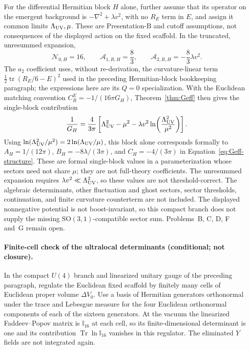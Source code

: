 For the differential Hermitian block \(H\) alone, further assume
that its operator on the emergent background is
\(-\nabla^2+\lambda v^2\), with no \(R_E\) term in \(E\), and assign
it common limits \(\Lambda_{\mathrm{UV}},\mu\). These are Presentation-B and cutoff
assumptions, not consequences of the displayed action on the fixed
scaffold. In the truncated, unresummed expansion,
\[
  \mathcal N_{0,H}=16,\qquad
  \mathcal A_{1,R,H}=\frac83,\qquad
  \mathcal A_{2,R,H}=-\frac83\lambda v^2 .
\]
The \(a_2\) coefficient uses, without re-derivation, the
curvature-linear term
\(\tfrac12\operatorname{tr}(R_E/6-E)^2\) used in the preceding
Hermitian-block bookkeeping paragraph; the expressions here are its
\(Q=0\) specialization. With the Euclidean matching convention
\(C_R^E=-1/(16\pi G_H)\), Theorem~\ref{thm:Geff} then gives the
single-block contribution
\[
  \frac1{G_H}
  =\frac{4}{3\pi}\left[
     \Lambda_{\mathrm{UV}}^2-\mu^2
     -\lambda v^2\ln\!\left(\frac{\Lambda_{\mathrm{UV}}^2}{\mu^2}\right)
   \right].
\]
Using \(\ln(\Lambda_{\mathrm{UV}}^2/\mu^2)=2\ln(\Lambda_{\mathrm{UV}}/\mu)\), this block alone
corresponds formally to
\(A_H=1/(12\pi)\), \(B_H=-8\lambda/(3\pi)\), and
\(C_H=-4/(3\pi)\) in Equation~\eqref{eq:Geff-structure}. These are
formal single-block values in a parameterization whose sectors need
not share \(\mu\); they are not full-theory coefficients. The
unresummed expansion requires \(\lambda v^2\ll\Lambda_{\mathrm{UV}}^2\), so these
values are not threshold-correct. The algebraic determinants, other
fluctuation and ghost sectors, sector thresholds, continuation, and
finite curvature counterterm are not included. The displayed
nonnegative potential is not boost-invariant, so this compact branch
does not supply the missing \(\mathrm{SO}(3,1)\)-compatible sector
sum. Problems~B, C, D, F and~G remain open.

\paragraph{Finite-cell check of the ultralocal determinants
(conditional; not closure).}
In the compact \(U(4)\) branch and linearized unitary gauge of the
preceding paragraph, regulate the Euclidean fixed scaffold by finitely
many cells of Euclidean proper volume \(\Delta V_0\). Use a basis of
Hermitian generators orthonormal under the trace and Lebesgue measure
for the four Euclidean orthonormal components of each of the sixteen
generators. At the vacuum the linearized Faddeev--Popov matrix is
\(\mathbb I_{16}\) at each cell, so its finite-dimensional determinant
is one and its contribution \(\operatorname{Tr}\ln\mathbb I_{16}\)
vanishes in this regulator. The eliminated \(Y\) fields are not
integrated again.


